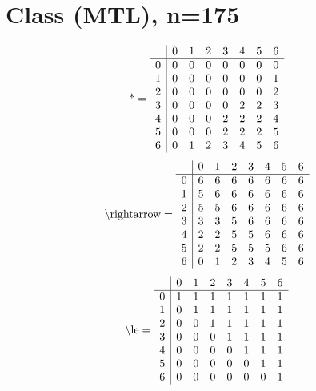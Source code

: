 \documentclass[11pt]{article}
\begin{document}
\section{Class (MTL), n=175}
\[\text{*} = 
\begin{array}{r | r r r r r r r}
 & 0 & 1 & 2 & 3 & 4 & 5 & 6 \\ \hline
0 & 0 & 0 & 0 & 0 & 0 & 0 & 0 \\
1 & 0 & 0 & 0 & 0 & 0 & 0 & 1 \\
2 & 0 & 0 & 0 & 0 & 0 & 0 & 2 \\
3 & 0 & 0 & 0 & 0 & 2 & 2 & 3 \\
4 & 0 & 0 & 0 & 2 & 2 & 2 & 4 \\
5 & 0 & 0 & 0 & 2 & 2 & 2 & 5 \\
6 & 0 & 1 & 2 & 3 & 4 & 5 & 6 \\
\end{array}
\]
\[\text{\textbackslash rightarrow} = 
\begin{array}{r | r r r r r r r}
 & 0 & 1 & 2 & 3 & 4 & 5 & 6 \\ \hline
0 & 6 & 6 & 6 & 6 & 6 & 6 & 6 \\
1 & 5 & 6 & 6 & 6 & 6 & 6 & 6 \\
2 & 5 & 5 & 6 & 6 & 6 & 6 & 6 \\
3 & 3 & 3 & 5 & 6 & 6 & 6 & 6 \\
4 & 2 & 2 & 5 & 5 & 6 & 6 & 6 \\
5 & 2 & 2 & 5 & 5 & 5 & 6 & 6 \\
6 & 0 & 1 & 2 & 3 & 4 & 5 & 6 \\
\end{array}
\]
\[\text{\textbackslash le} = 
\begin{array}{r | r r r r r r r}
 & 0 & 1 & 2 & 3 & 4 & 5 & 6 \\ \hline
0 & 1 & 1 & 1 & 1 & 1 & 1 & 1 \\
1 & 0 & 1 & 1 & 1 & 1 & 1 & 1 \\
2 & 0 & 0 & 1 & 1 & 1 & 1 & 1 \\
3 & 0 & 0 & 0 & 1 & 1 & 1 & 1 \\
4 & 0 & 0 & 0 & 0 & 1 & 1 & 1 \\
5 & 0 & 0 & 0 & 0 & 0 & 1 & 1 \\
6 & 0 & 0 & 0 & 0 & 0 & 0 & 1 \\
\end{array}
\]
\end{document}

